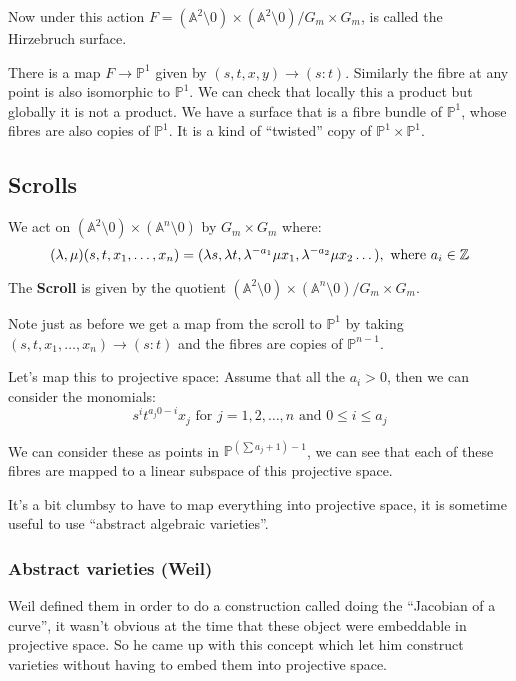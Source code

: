 Now under this action $F = (\mathbb{A}^2\setminus 0)\times(\mathbb{A}^2\setminus 0)/G_m\times G_m$, is called the Hirzebruch surface.

There is a map $F\rightarrow \mathbb{P}^1$ given by $(s,t,x,y)\rightarrow (s\colon t)$. Similarly the fibre at any point is also isomorphic to $\mathbb{P}^{1}$. We can check that locally this a product but globally it is not a product. We have a surface that is a fibre bundle of $\mathbb{P}^1$, whose fibres are also copies of $\mathbb{P}^1$. It is a kind of ``twisted'' copy of $\mathbb{P}^1\times \mathbb{P}^1$.

\subsection{Scrolls}

We act on $(\mathbb{A}^2\setminus 0)\times (\mathbb{A}^n\setminus 0)$ by $G_m\times G_m$ where:\begin{equation*}
    (\lambda,\mu)(s,t,x_1,\dots,x_n) = (\lambda s, \lambda t, \lambda^{-a_1}\mu x_1,\lambda^{-a_2}\mu x_2\dots), \text{ where }a_i\in \mathbb{Z}
\end{equation*}

The \textbf{Scroll} is given by the quotient $(\mathbb{A}^2\setminus 0)\times (\mathbb{A}^n\setminus 0)/G_m\times G_m$.

Note just as before we get a map from the scroll to $\mathbb{P}^1$ by taking $(s,t,x_1,\dots, x_n)\rightarrow (s\colon t)$ and the fibres are copies of $\mathbb{P}^{n-1}$. 

Let's map this to projective space: Assume that all the $a_i>0$, then we can consider the monomials: \[{s^i}{t^{a_j0-i}}x_j \text{ for }j=1,2,\ldots,n \text{ and }0\leq i \leq a_j\]

We can consider these as points in $\mathbb{P}^{(\sum a_j +1) - 1}$, we can see that each of these fibres are mapped to a linear subspace of this projective space. 

It's a bit clumbsy to have to map everything into projective space, it is sometime useful to use ``abstract algebraic varieties''.

\subsubsection{Abstract varieties (Weil)}
Weil defined them in order to do a construction called doing the ``Jacobian of a curve'', it wasn't obvious at the time that these object were embeddable in projective space. So he came up with this concept which let him construct varieties without having to embed them into projective space.

